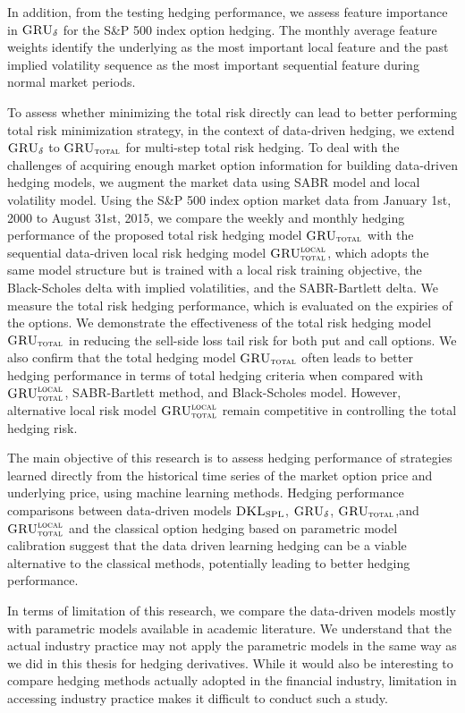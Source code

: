 \documentclass[letterpaper,12pt,titlepage,oneside,final]{book}
\numberwithin{equation}{section}
\theoremstyle{definition}
\newcommand{\model}{\textsc{GRU}_\delta}
\newcommand{\modelT}{\textsc{GRU}_{\textsc{total}}}
\newcommand{\modelL}{\textsc{GRU}_{\textsc{total}}^{\textsc{local}}}
\newcommand{\DKLs}{\bf\textsc{DKL}_{\text{SPL}}}
\begin{document}
In addition, from the testing hedging performance, we assess feature importance in  $\model$  for the S\&P 500 index  option hedging. The monthly average feature weights identify the underlying as the most important local feature and the past implied volatility sequence as the most important sequential feature during normal market periods.

To assess whether minimizing the  total risk directly can lead to better performing total risk minimization strategy, in the context of data-driven hedging, we extend  $\model$ to $\modelT$ for multi-step total risk hedging.  To deal with the challenges of acquiring enough market option information for building data-driven hedging models,  we augment the market data using SABR model and local volatility model. Using the S\&P 500 index  option market data from January 1st, 2000 to  August 31st, 2015, we compare  the weekly and monthly hedging performance of the proposed total risk hedging model $\modelT$  with the sequential data-driven local risk hedging model $\modelL$, which adopts the same model structure but is trained with a local risk training objective, the Black-Scholes delta with implied volatilities, and the SABR-Bartlett delta. We measure the total risk hedging performance, which is evaluated on the expiries of the options. We demonstrate the effectiveness of the total risk hedging model $\modelT$ in reducing the sell-side loss tail risk for both put and call options. We also confirm that the  total hedging model $\modelT$ often leads to better hedging performance in terms of total hedging criteria when compared with $\modelL$,  SABR-Bartlett method, and Black-Scholes model. However, alternative local risk model $\modelL$ remain competitive in controlling the total hedging risk.


The main objective of this research  is to assess hedging performance of strategies learned  directly from the  historical time series of the market option price and underlying price,  using machine learning methods. Hedging  performance comparisons between data-driven  models $\DKLs$, $\model$, $\modelT$,and  $\modelL$ and the  classical  option hedging based on parametric model calibration suggest that the data driven  learning hedging can be a viable alternative to the classical methods,  potentially leading to better hedging performance.  

In terms of limitation of this research, we compare the data-driven models mostly with parametric models available in academic literature.  We understand that the actual industry practice may not apply the parametric models in the same way as we did in this thesis for hedging derivatives.
While it would also  be interesting to compare hedging methods actually adopted in the financial industry,   limitation in accessing  industry practice makes it difficult to conduct such a study.
\end{document}
